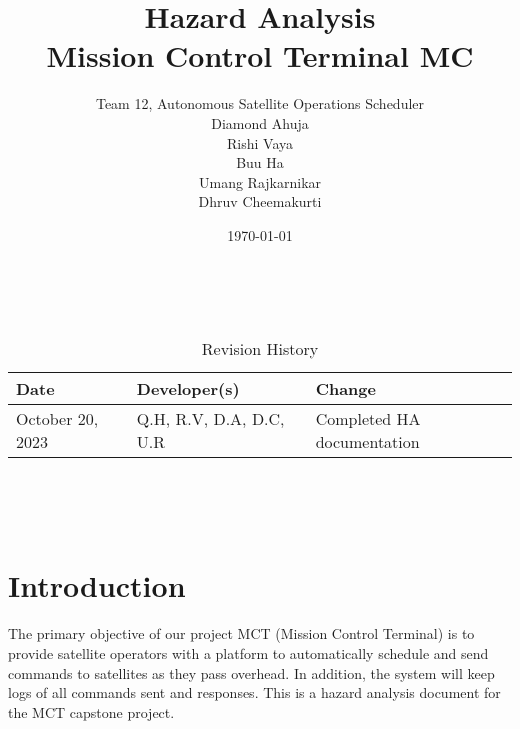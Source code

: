 \documentclass{article}
\title{Hazard Analysis \\\progname Mission Control Terminal MC}
\author{Team 12, Autonomous Satellite Operations Scheduler\\ Diamond Ahuja \\ Rishi Vaya \\ Buu Ha \\ Umang Rajkarnikar \\ Dhruv Cheemakurti}
\date{\today}
\begin{document}
\maketitle

~\newpage


\begin{table}[hp]
\caption{Revision History} \label{TblRevisionHistory}
\begin{tabularx}{\textwidth}{llX}
\toprule
\textbf{Date} & \textbf{Developer(s)} & \textbf{Change}\\
\midrule
October 20, 2023 & Q.H, R.V, D.A, D.C, U.R & Completed HA documentation\\
\bottomrule
\end{tabularx}
\end{table}

~\newpage

\tableofcontents

~\newpage



\section{Introduction}
The primary objective of our project MCT (Mission Control Terminal) is to provide satellite operators with a platform to automatically schedule and send commands to satellites as they pass overhead. In addition, the system will keep logs of all commands sent and responses. This is a hazard analysis document for the MCT capstone project.
\end{document}
